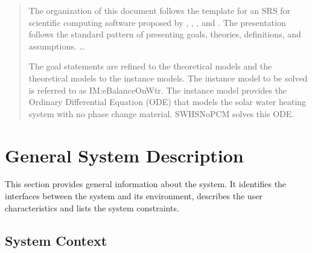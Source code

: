 \documentclass[12pt]{article}
\begin{document}
\begin{quote}
The organization of this document follows the template for an SRS for scientific 
computing software proposed by \cite{koothoor2013}, \cite{smithLai2005}, 
\cite{smithEtAl2007}, and \cite{smithKoothoor2016}. The presentation follows 
the standard pattern of presenting goals, theories, definitions, and assumptions.
\dots


The goal statements are refined to the theoretical models and the theoretical 
models to the instance models. The instance model to be solved is referred to 
as IM:eBalanceOnWtr. The instance model provides the Ordinary Differential 
Equation (ODE) that models the solar water heating system with no phase change 
material. SWHSNoPCM solves this ODE.
\end{quote}

\section{General System Description}

This section provides general information about the system.  It identifies the
interfaces between the system and its environment, describes the user
characteristics and lists the system constraints.


\subsection{System Context}
\end{document}

